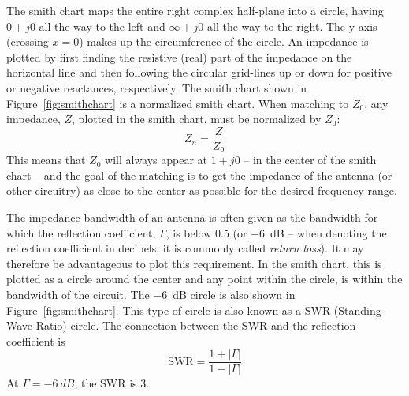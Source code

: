 The smith chart maps the entire right complex half-plane into a circle, having $0+j0$ all the way to the left and $\infty+j0$ all the way to the right. The y-axis (crossing $x=0$) makes up the circumference of the circle. An impedance is plotted by first finding the resistive (real) part of the impedance on the horizontal line and then following the circular grid-lines up or down for positive or negative reactances, respectively. 
The smith chart shown in Figure~\ref{fig:smithchart} is a normalized smith chart. When matching to $Z_0$, any impedance, $Z$, plotted in the smith chart, must be normalized by $Z_0$:
\begin{equation}
    Z_n = \frac{Z}{Z_0}
\end{equation}
This means that $Z_0$ will always appear at $1+j0$ -- in the center of the smith chart -- and the goal of the matching is to get the impedance of the antenna (or other circuitry) as close to the center as possible for the desired frequency range.

The impedance bandwidth of an antenna is often given as the bandwidth for which the reflection coefficient, $\Gamma$, is below 0.5 (or \SI{-6}{dB} -- when denoting the reflection coefficient in decibels, it is commonly called \emph{return loss}). It may therefore be advantageous to plot this requirement. In the smith chart, this is plotted as a circle around the center and any point within the circle, is within the bandwidth of the circuit. The \SI{-6}{dB} circle is also shown in Figure~\ref{fig:smithchart}. This type of circle is also known as a SWR (Standing Wave Ratio) circle. The connection between the SWR and the reflection coefficient is \cite{pozar2011microwave}
\begin{equation}
    \text{SWR} = \frac{1 + |\Gamma|}{1 - |\Gamma|}
\end{equation}
At $\Gamma = \SI{-6}{dB}$, the SWR is 3.

